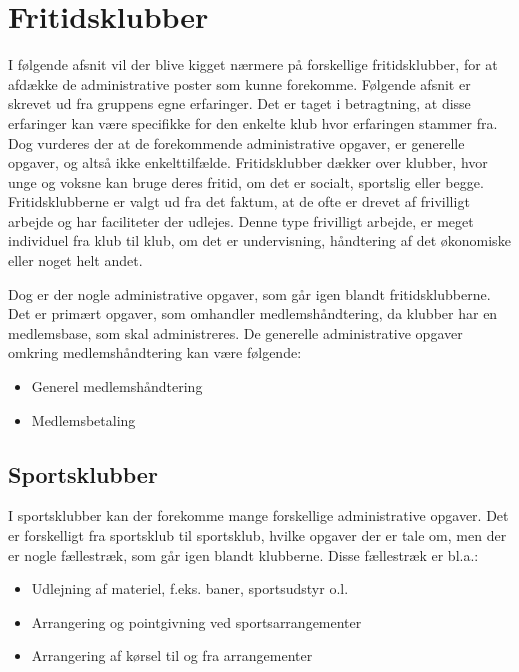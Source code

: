 \chapter{Fritidsklubber} \label{chap:Fritidsklubber}

I følgende afsnit vil der blive kigget nærmere på forskellige fritidsklubber, for at afdække de administrative poster
som kunne forekomme. Følgende afsnit er skrevet ud fra gruppens egne erfaringer. 
Det er taget i betragtning, at disse erfaringer
kan være specifikke for den enkelte klub hvor erfaringen stammer fra. 
Dog vurderes der at de forekommende administrative opgaver, er generelle opgaver, og altså ikke enkelttilfælde. 
Fritidsklubber dækker over klubber, hvor unge og voksne kan bruge deres fritid, om det er socialt, sportslig eller begge. 
Fritidsklubberne er valgt ud fra det faktum, at de ofte er drevet af frivilligt arbejde og har faciliteter der udlejes. 
Denne type frivilligt arbejde, er meget individuel fra klub til klub, om det er undervisning, håndtering af det økonomiske eller noget helt andet.

Dog er der nogle administrative opgaver, som går igen blandt fritidsklubberne. Det er primært opgaver, som omhandler medlemshåndtering, da klubber har en medlemsbase, som skal administreres. De generelle administrative opgaver omkring medlemshåndtering kan være følgende:
\begin{itemize}
	\item Generel medlemshåndtering
	\item Medlemsbetaling
\end{itemize}


\section{Sportsklubber} \label{Sportsklubber}

I sportsklubber kan der forekomme mange forskellige administrative opgaver. Det er forskelligt fra sportsklub til sportsklub, hvilke opgaver der er tale om, men der er nogle fællestræk, som går igen blandt klubberne. Disse fællestræk er bl.a.:
\begin{itemize}
	\item Udlejning af materiel, f.eks. baner, sportsudstyr o.l.
	\item Arrangering og pointgivning ved sportsarrangementer
	\item Arrangering af kørsel til og fra arrangementer
\end{itemize}

